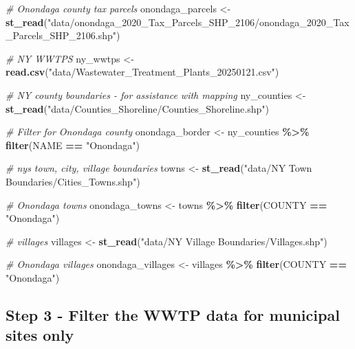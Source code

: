 \documentclass[
]{book}
\newenvironment{Shaded}{\begin{snugshade}}{\end{snugshade}}
\newcommand{\CommentTok}[1]{\textcolor[rgb]{0.56,0.35,0.01}{\textit{#1}}}
\newcommand{\FunctionTok}[1]{\textcolor[rgb]{0.13,0.29,0.53}{\textbf{#1}}}
\newcommand{\NormalTok}[1]{#1}
\newcommand{\OtherTok}[1]{\textcolor[rgb]{0.56,0.35,0.01}{#1}}
\newcommand{\SpecialCharTok}[1]{\textcolor[rgb]{0.81,0.36,0.00}{\textbf{#1}}}
\newcommand{\StringTok}[1]{\textcolor[rgb]{0.31,0.60,0.02}{#1}}
\begin{document}
\begin{Shaded}
\begin{Highlighting}[]
\CommentTok{\# Onondaga county tax parcels}
\NormalTok{onondaga\_parcels }\OtherTok{\textless{}{-}} 
  \FunctionTok{st\_read}\NormalTok{(}\StringTok{"data/onondaga\_2020\_Tax\_Parcels\_SHP\_2106/onondaga\_2020\_Tax\_Parcels\_SHP\_2106.shp"}\NormalTok{)}

\CommentTok{\# NY WWTPS}
\NormalTok{ny\_wwtps }\OtherTok{\textless{}{-}} \FunctionTok{read.csv}\NormalTok{(}\StringTok{"data/Wastewater\_Treatment\_Plants\_20250121.csv"}\NormalTok{)}

\CommentTok{\# NY county boundaries {-} for assistance with mapping}
\NormalTok{ny\_counties }\OtherTok{\textless{}{-}} 
  \FunctionTok{st\_read}\NormalTok{(}\StringTok{"data/Counties\_Shoreline/Counties\_Shoreline.shp"}\NormalTok{)}

\CommentTok{\# Filter for Onondaga county}
\NormalTok{onondaga\_border }\OtherTok{\textless{}{-}}\NormalTok{ ny\_counties }\SpecialCharTok{\%\textgreater{}\%}
  \FunctionTok{filter}\NormalTok{(NAME }\SpecialCharTok{==} \StringTok{"Onondaga"}\NormalTok{)}

\CommentTok{\# nys town, city, village boundaries}
\NormalTok{towns }\OtherTok{\textless{}{-}} 
  \FunctionTok{st\_read}\NormalTok{(}\StringTok{"data/NY Town Boundaries/Cities\_Towns.shp"}\NormalTok{)}

\CommentTok{\# Onondaga towns}
\NormalTok{onondaga\_towns }\OtherTok{\textless{}{-}}\NormalTok{ towns }\SpecialCharTok{\%\textgreater{}\%}
  \FunctionTok{filter}\NormalTok{(COUNTY }\SpecialCharTok{==} \StringTok{"Onondaga"}\NormalTok{)}

\CommentTok{\# villages}
\NormalTok{villages }\OtherTok{\textless{}{-}} 
  \FunctionTok{st\_read}\NormalTok{(}\StringTok{"data/NY Village Boundaries/Villages.shp"}\NormalTok{)}

\CommentTok{\# Onondaga villages}
\NormalTok{onondaga\_villages }\OtherTok{\textless{}{-}}\NormalTok{ villages }\SpecialCharTok{\%\textgreater{}\%}
  \FunctionTok{filter}\NormalTok{(COUNTY }\SpecialCharTok{==} \StringTok{"Onondaga"}\NormalTok{)}
\end{Highlighting}
\end{Shaded}

\subsection{Step 3 - Filter the WWTP data for municipal sites only}\label{step-3---filter-the-wwtp-data-for-municipal-sites-only}
\end{document}
